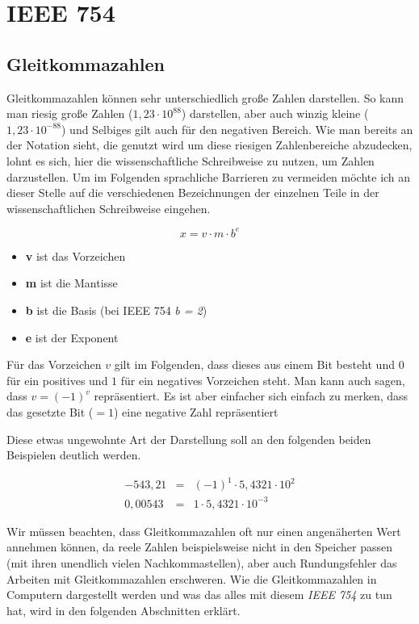 \section{IEEE 754}

\subsection{Gleitkommazahlen}

Gleitkommazahlen können sehr unterschiedlich große Zahlen darstellen. So kann man riesig große Zahlen ($1,23\cdot 10^{88}$) darstellen, aber auch winzig kleine ($1,23\cdot 10^{-88}$) und Selbiges gilt auch für den negativen Bereich. Wie man bereits an der Notation sieht, die genutzt wird um diese riesigen Zahlenbereiche abzudecken, lohnt es sich, hier die wissenschaftliche Schreibweise zu nutzen, um Zahlen darzustellen. Um im Folgenden sprachliche Barrieren zu vermeiden möchte ich an dieser Stelle auf die verschiedenen Bezeichnungen der einzelnen Teile in der wissenschaftlichen Schreibweise eingehen.

$$ x = v \cdot m \cdot b^{e}$$

\begin{itemize}
\item \textbf{v} ist das Vorzeichen
\item \textbf{m} ist die Mantisse
\item \textbf{b} ist die Basis (bei IEEE 754 \textit{b = 2})
\item \textbf{e} ist der Exponent
\end{itemize}

Für das Vorzeichen $v$ gilt im Folgenden, dass dieses aus einem Bit besteht und $0$ für ein positives und $1$ für ein negatives Vorzeichen steht. Man kann auch sagen, dass $ v = (-1)^{v} $ repräsentiert. Es ist aber einfacher sich einfach zu merken, dass das gesetzte Bit ($= 1$) eine negative Zahl repräsentiert

Diese etwas ungewohnte Art der Darstellung soll an den folgenden beiden Beispielen deutlich werden.

\begin{eqnarray}
-543,21 & = & (-1)^{1} \cdot 5,4321 \cdot 10^2 \\
0,00543 & = & 1 \cdot 5,4321 \cdot 10^{-3}
\end{eqnarray}


Wir müssen beachten, dass Gleitkommazahlen oft nur einen angenäherten Wert annehmen können, da reele Zahlen beispielsweise nicht in den Speicher passen (mit ihren unendlich vielen Nachkommastellen), aber auch Rundungsfehler das Arbeiten mit Gleitkommazahlen erschweren. Wie die Gleitkommazahlen in Computern dargestellt werden und was das alles mit diesem \textit{IEEE 754} zu tun hat, wird in den folgenden Abschnitten erklärt.

